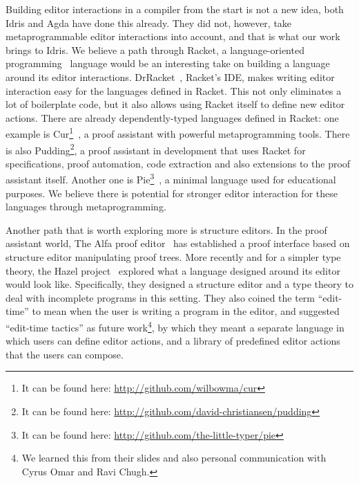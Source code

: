Building editor interactions in a compiler from the start is not a new idea,
both Idris and Agda have done this already. They did not, however, take
metaprogrammable editor interactions into account, and that is what our work
brings to Idris. We believe a path through Racket, a language-oriented
programming~\cite{racketManifesto, feltey2016languages} language would be an
interesting take on building a language around its editor interactions.
DrRacket~\cite{drracket}, Racket's IDE, makes writing editor interaction easy
for the languages defined in Racket. This not only eliminates a lot of
boilerplate code, but it also allows using Racket itself to define new editor
actions. There are already dependently-typed languages defined in Racket: one
example is Cur\footnote{It can be found here:
\url{http://github.com/wilbowma/cur}}~\cite{cur}, a proof assistant with
powerful metaprogramming tools. There is also Pudding\footnote{It can be found
here: \url{http://github.com/david-christiansen/pudding}}, a proof assistant in
development that uses Racket for specifications, proof automation, code
extraction and also extensions to the proof assistant itself.
Another one is Pie\footnote{It can be found
here: \url{http://github.com/the-little-typer/pie}}~\cite{theLittleTyper}, a
minimal language used for educational purposes.
We believe there is potential
for stronger editor interaction for these languages through metaprogramming.

Another path that is worth exploring more is structure editors. In the proof
assistant world, The Alfa proof editor~\cite{alfa} has established a proof
interface based on structure editor manipulating proof trees. More recently and
for a simpler type theory, the Hazel project~\cite{hazelnut,hazelEditor}
explored what a language designed around its editor would look like.
Specifically, they designed a structure editor and a type theory to deal with
incomplete programs in this setting. They also coined the term ``edit-time'' to
mean when the user is writing a program in the editor, and suggested
``edit-time tactics'' as future work\footnote{We learned this from their slides
and also personal communication with Cyrus Omar and Ravi Chugh.}, by which they
meant a separate language in which users can define editor actions, and a
library of predefined editor actions that the users can compose.


